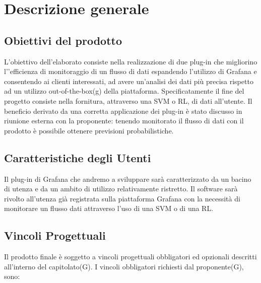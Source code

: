 \section{Descrizione generale}
	\subsection{Obiettivi del prodotto}
	L’obiettivo dell’elaborato consiste nella realizzazione di due plug-in che migliorino l’’efficienza di monitoraggio di un flusso di dati espandendo l’utilizzo di Grafana e consentendo ai clienti  interessati, ad avere un’analisi dei dati più precisa rispetto ad un utilizzo out-of-the-box(g) della piattaforma. Specificatamente il  fine del progetto consiste nella fornitura, attraverso una SVM o RL, di dati all’utente. Il beneficio derivato da una corretta applicazione dei plug-in è stato discusso in riunione esterna con la proponente: tenendo monitorato il flusso di dati con il prodotto è possibile ottenere previsioni probabilistiche. 
	\subsection{Caratteristiche degli Utenti}
	Il plug-in di Grafana che andremo a sviluppare sarà caratterizzato da un bacino di utenza e da un ambito di utilizzo relativamente ristretto.
Il software sarà rivolto all’utenza già registrata sulla piattaforma Grafana con la necessità di monitorare un flusso dati attraverso l’uso di una SVM o di una RL.

	 \subsection{Vincoli Progettuali}
	 Il prodotto finale è soggetto a vincoli progettuali obbligatori ed opzionali descritti all’interno del capitolato(G). I vincoli obbligatori richiesti dal proponente(G), sono:

